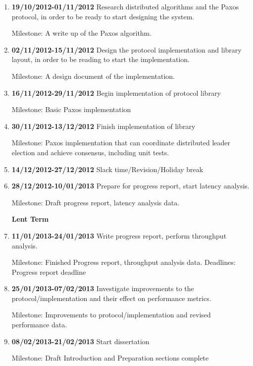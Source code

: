 \begin{enumerate}

\item {\bf 19/10/2012-01/11/2012} Research distributed algorithms and the Paxos protocol, in order
to be ready to start designing the system.

Milestone: A write up of the Paxos algorithm.

\item {\bf 02/11/2012-15/11/2012} Design the protocol implementation and library layout, in order
to be reading to start the implementation.

Milestone: A design document of the implementation.

\item {\bf 16/11/2012-29/11/2012} Begin implementation of protocol library

Milestone: Basic Paxos implementation


\item {\bf 30/11/2012-13/12/2012} Finish implementation of library

Milestone: Paxos implementation that can coordinate distributed leader election and achieve
consensus, including unit tests.

\item {\bf 14/12/2012-27/12/2012} Slack time/Revision/Holiday break

\item {\bf 28/12/2012-10/01/2013} Prepare for progress report, start latency analysis.

Milestone: Draft progress report, latency analysis data.

{\bf Lent Term}
\item {\bf 11/01/2013-24/01/2013} Write progress report, perform throughput analysis.

Milestone: Finished Progress report, throughput analysis data.
Deadlines: Progress report deadline

\item {\bf 25/01/2013-07/02/2013} Investigate improvements to the protocol/implementation and their effect on
performance metrics.

Milestone: Improvements to protocol/implementation and revised performance data.

\item {\bf 08/02/2013-21/02/2013} Start dissertation

Milestone: Draft Introduction and Preparation sections complete


\end{enumerate}
